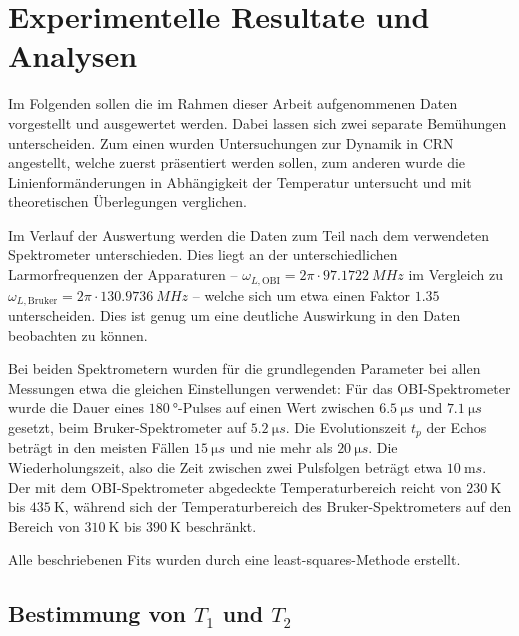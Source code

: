 \chapter{Experimentelle Resultate und Analysen}
\label{chapter:experiment}

Im Folgenden sollen die im Rahmen dieser Arbeit aufgenommenen Daten vorgestellt und ausgewertet werden. Dabei lassen sich zwei separate Bemühungen unterscheiden. Zum einen wurden Untersuchungen zur Dynamik in CRN angestellt, welche zuerst präsentiert werden sollen, zum anderen wurde die Linienformänderungen in Abhängigkeit der Temperatur untersucht und mit theoretischen Überlegungen verglichen.

Im Verlauf der Auswertung werden die Daten zum Teil nach dem verwendeten Spektrometer unterschieden. Dies liegt an der unterschiedlichen Larmorfrequenzen der Apparaturen -- $\omega_{L, \text{OBI}} = 2\pi \cdot \SI{97.1722}{MHz}$ im Vergleich zu $\omega_{L, \text{Bruker}} = 2\pi \cdot \SI{130.9736}{MHz}$ -- welche sich um etwa einen Faktor $\SI{1.35}{}$ unterscheiden. Dies ist genug um eine deutliche Auswirkung in den Daten beobachten zu können.

Bei beiden Spektrometern wurden für die grundlegenden Parameter bei allen Messungen etwa die gleichen Einstellungen verwendet: Für das OBI-Spektrometer wurde die Dauer eines $\SI{180}{\degree}$-Pulses auf einen Wert zwischen $\SI{6.5}{\micro s}$ und $\SI{7.1}{\micro s}$ gesetzt, beim Bruker-Spektrometer auf $\SI{5.2}{\micro s}$. Die Evolutionszeit $t_p$ der Echos beträgt in den meisten Fällen $\SI{15}{\micro s}$ und nie mehr als $\SI{20}{\micro s}$. Die Wiederholungszeit, also die Zeit zwischen zwei Pulsfolgen beträgt etwa $\SI{10}{\milli s}$. Der mit dem OBI-Spektrometer abgedeckte Temperaturbereich reicht von $\SI{230}{\kelvin}$ bis $\SI{435}{\kelvin}$, während sich der Temperaturbereich des Bruker-Spektrometers auf den Bereich von $\SI{310}{\kelvin}$ bis $\SI{390}{\kelvin}$ beschränkt.

Alle beschriebenen Fits wurden durch eine least-squares-Methode erstellt.


\section{Bestimmung von $T_1$ und $T_2$} \label{section:res:T_1}

